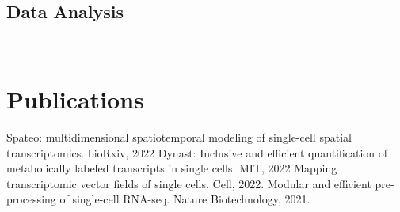 \documentclass[]{resume}
\begin{document}
\begin{minipage}[t]{0.28\textwidth}
\subsection{Data Analysis}
\\
\sectionsep





\section{Publications}
\renewcommand\refname{\vskip -1.5em} %
\begin{thebibliography}{9}
Spateo: multidimensional spatiotemporal modeling of single-cell spatial transcriptomics. bioRxiv, 2022
Dynast: Inclusive and efficient quantification of metabolically labeled transcripts in single cells. MIT, 2022
Mapping transcriptomic vector fields of single cells. Cell, 2022.
Modular and efficient pre-processing of single-cell RNA-seq. Nature Biotechnology, 2021.
\end{thebibliography}


%
%

\end{minipage}
\end{document}
